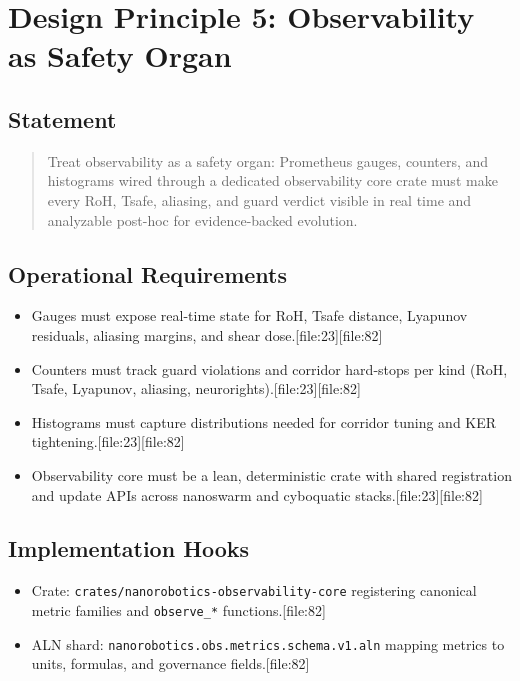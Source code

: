 \documentclass[11pt]{article}
\begin{document}
\section{Design Principle 5: Observability as Safety Organ}

\subsection{Statement}

\begin{quote}
Treat observability as a safety organ: Prometheus gauges, counters, and histograms wired through a dedicated observability core crate must make every RoH, Tsafe, aliasing, and guard verdict visible in real time and analyzable post-hoc for evidence-backed evolution.
\end{quote}

\subsection{Operational Requirements}

\begin{itemize}[nosep]
  \item Gauges must expose real-time state for RoH, Tsafe distance, Lyapunov residuals, aliasing margins, and shear dose.[file:23][file:82]
  \item Counters must track guard violations and corridor hard-stops per kind (RoH, Tsafe, Lyapunov, aliasing, neurorights).[file:23][file:82]
  \item Histograms must capture distributions needed for corridor tuning and KER tightening.[file:23][file:82]
  \item Observability core must be a lean, deterministic crate with shared registration and update APIs across nanoswarm and cyboquatic stacks.[file:23][file:82]
\end{itemize}

\subsection{Implementation Hooks}

\begin{itemize}[nosep]
  \item Crate: \texttt{crates/nanorobotics-observability-core} registering canonical metric families and \texttt{observe\_*} functions.[file:82]
  \item ALN shard: \texttt{nanorobotics.obs.metrics.schema.v1.aln} mapping metrics to units, formulas, and governance fields.[file:82]
\end{itemize}
\end{document}
